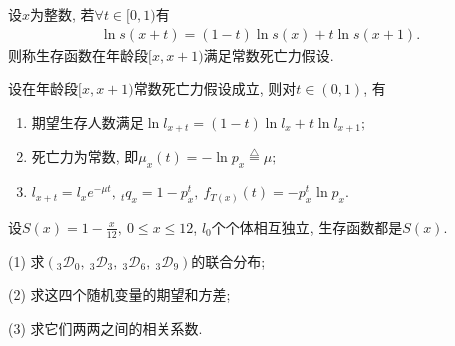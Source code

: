 \documentclass[lang=cn,10pt]{elegantbook}
\begin{document}
\begin{definition}[常数死亡力假设]
	设$x$为整数, 若$\forall t\in [0,1)$有
\begin{align}\label{tulb}
    \ln s(x+t)=(1-t)\ln s(x)+t\ln s(x+1).
\end{align}
则称生存函数在年龄段$[x,x+1)$满足常数死亡力假设.
\end{definition}

\begin{corollary}
	设在年龄段$[x,x+1)$常数死亡力假设成立, 则对$t\in (0,1)$, 有
    \begin{enumerate}
		\item 期望生存人数满足$\ln l_{x+t}=(1-t)\ln l_{x}+t\ln l_{x+1};$
		\item 死亡力为常数, 即$\mu _{x}(t)=-\ln p_{x}\stackrel{\triangle}{=}\mu;$
		\item $l_{x+t}=l_{x}e^{-\mu t},\ _{t}q_{x}=1-p^{t}_{x},\ f_{T(x)}(t)=-p_{x}^{t}\ln p_{x}.$
	\end{enumerate}
\end{corollary}

\begin{example}
    设$S(x)=1-\frac{x}{12},\ 0\leq x\leq 12$, $l_{0}$个个体相互独立, 生存函数都是$S(x)$.

    (1) 求$(_{3}\mathscr D _{0},\ _{3}\mathscr D_{3},\ _{3}\mathscr D _{6},\ _{3}\mathscr D _{9})$的联合分布;

    (2) 求这四个随机变量的期望和方差;

    (3) 求它们两两之间的相关系数.
\end{example}
\end{document}
